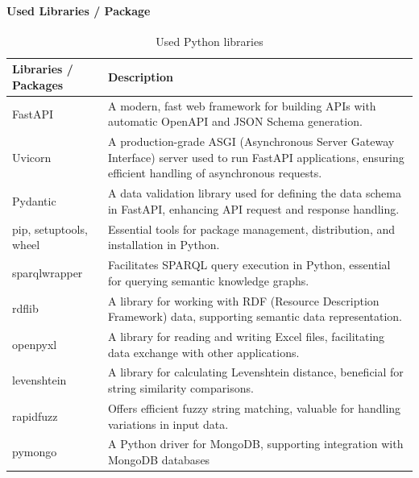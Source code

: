         \paragraph{Used Libraries / Package}
        \begin{table}[H]
            \centering
    	    {
    	    \begin{tabular}{ | m{2.5cm} | m{12cm} | }
                \hline
                \rowcolor{teal!30} Libraries / Packages & Description \\
                
                \hline
                FastAPI & A modern, fast web framework for building APIs with automatic OpenAPI and JSON Schema generation.\\

                \hline
                Uvicorn & A production-grade ASGI (Asynchronous Server Gateway Interface) server used to run FastAPI applications, ensuring efficient handling of asynchronous requests.\\

                \hline
                Pydantic & A data validation library used for defining the data schema in FastAPI, enhancing API request and response handling.\\

                \hline
                pip, setuptools, wheel & Essential tools for package management, distribution, and installation in Python.\\

                \hline
                sparqlwrapper & Facilitates SPARQL query execution in Python, essential for querying semantic knowledge graphs.\\

                \hline
                rdflib & A library for working with RDF (Resource Description Framework) data, supporting semantic data representation.\\

                \hline
                openpyxl & A library for reading and writing Excel files, facilitating data exchange with other applications.\\

                \hline
                levenshtein & A library for calculating Levenshtein distance, beneficial for string similarity comparisons.\\

                \hline
                rapidfuzz & Offers efficient fuzzy string matching, valuable for handling variations in input data.\\

                \hline
                pymongo & A Python driver for MongoDB, supporting integration with MongoDB databases\\
                
                \hline
            \end{tabular}}
            \caption{\label{tab:python-libs} Used Python libraries}
        \end{table}
    
